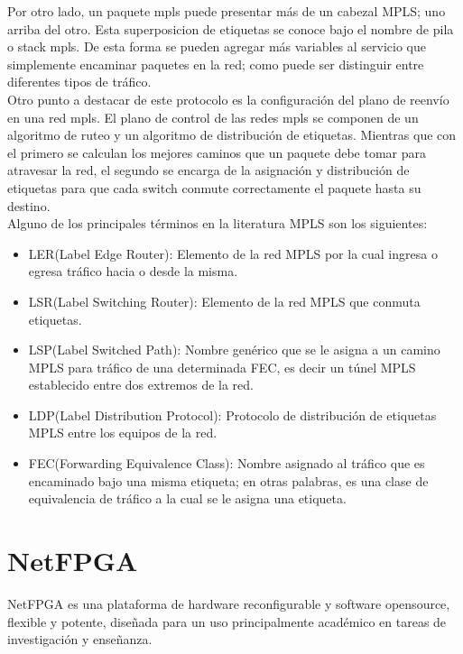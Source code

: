 Por otro lado, un paquete mpls puede presentar más de un cabezal MPLS; uno arriba del otro. Esta superposicion de etiquetas se conoce bajo el nombre de pila o stack mpls. De esta forma se pueden agregar más variables al servicio que simplemente encaminar paquetes en la red; como puede ser distinguir entre diferentes tipos de tráfico.\\

Otro punto a destacar de este protocolo es la configuración del plano de reenvío en una red mpls. El plano de control de las redes mpls se componen de un algoritmo de ruteo y un algoritmo de distribución de etiquetas. Mientras que con el primero se calculan los mejores caminos que un paquete debe tomar para atravesar la red, el segundo se encarga de la asignación y distribución de etiquetas para que cada switch conmute correctamente el paquete hasta su destino.\\

Alguno de los principales términos en la literatura MPLS son los siguientes:

\begin{itemize}
\item LER(Label Edge Router): Elemento de la red MPLS por la cual ingresa o egresa tráfico hacia o desde la misma.
\item LSR(Label Switching Router): Elemento de la red MPLS que conmuta etiquetas.
\item LSP(Label Switched Path): Nombre genérico que se le asigna a un camino MPLS para tráfico de una determinada FEC, es decir un túnel MPLS establecido entre dos extremos de la red.
\item LDP(Label Distribution Protocol): Protocolo de distribución de etiquetas MPLS entre los equipos de la red.
\item FEC(Forwarding Equivalence Class): Nombre asignado al tráfico que es encaminado bajo una misma etiqueta; en otras palabras, es una clase de equivalencia de tráfico a la cual se le asigna una etiqueta.
 
\end{itemize}

\section{NetFPGA}

NetFPGA\cite{NetFPGA1} es una plataforma de hardware reconfigurable y software opensource, flexible y potente, diseñada para un uso principalmente académico en tareas de investigación y enseñanza.\\


